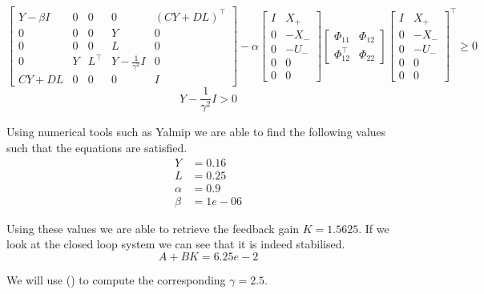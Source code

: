 \begin{equation*}
	\begin{bmatrix}
		Y - \beta I & 0 & 0 & 0 & (CY + DL)^\top \\
		0 & 0 & 0 & Y & 0 \\
		0 & 0 & 0 & L & 0 \\
		0 & Y & L^\top & Y - \frac{1}{\gamma^2}I & 0 \\
	CY + DL & 0 & 0 & 0 & I
	\end{bmatrix} - \alpha
	\begin{bmatrix} I&X_+ \\ 0 & -X_- \\ 0&-U_- \\ 0&0 \\ 0&0 \end{bmatrix}
	\begin{bmatrix} \Phi_{11} & \Phi_{12} \\ \Phi_{12}^\top & \Phi_{22} \end{bmatrix}
	\begin{bmatrix} I&X_+ \\ 0 & -X_- \\ 0&-U_- \\ 0&0 \\ 0&0 \end{bmatrix}^\top \geq 0
\end{equation*}
\begin{equation*}
	Y - \frac{1}{\gamma^2}I > 0
\end{equation*}

Using numerical tools such as Yalmip we are able to find the following values such that the equations are satisfied.
\begin{align*}
	Y      &= 0.16\\
	L      &= 0.25\\
	\alpha &= 0.9\\
	\beta  &= 1e-06
\end{align*}

Using these values we are able to retrieve the feedback gain $K = 1.5625$. If we look at the closed loop system we can see that it is indeed stabilised.
\begin{equation*}
	A + BK = 6.25e-2
\end{equation*}

We will use () to compute the corresponding $\gamma = 2.5$.


























